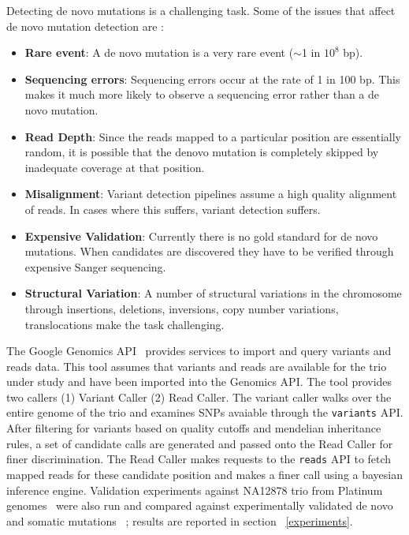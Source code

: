 \documentclass{article}
\begin{document}
\vspace{1em}
Detecting de novo mutations is a challenging task. Some of the issues that affect de novo mutation detection are : 
\begin{itemize}
\item \textbf{Rare event}: A de novo mutation is a very rare event ($\sim$1 in $10^8$ bp).
\item \textbf{Sequencing errors}: Sequencing errors occur at the rate of 1 in 100 bp. This makes it much more likely to observe a sequencing error rather than a de novo mutation.
\item \textbf{Read Depth}: Since the reads mapped to a particular position are essentially random, it is possible that the denovo mutation is completely skipped by inadequate coverage at that position.
\item \textbf{Misalignment}: Variant detection pipelines assume a high quality alignment of reads. In cases where this suffers, variant detection suffers.
\item \textbf{Expensive Validation}: Currently there is no gold standard for de novo mutations. When candidates are discovered they have to be verified through expensive Sanger sequencing.
\item \textbf{Structural Variation}: A number of structural variations in the chromosome through insertions, deletions, inversions, copy number variations, translocations make the task challenging.
\end{itemize}

The Google Genomics API~\cite{GoogleGenomics} provides services to import and query variants and reads data. This tool assumes that variants and reads are available for the trio under study and have been imported into the Genomics API. The tool provides two callers (1) Variant Caller (2) Read Caller. The variant caller walks over the entire genome of the trio and examines SNPs avaiable through the \verb|variants| API. After filtering for variants based on quality cutoffs and mendelian inheritance rules, a set of candidate calls are generated and passed onto the Read Caller for finer discrimination. The Read Caller makes requests to the \verb|reads| API to fetch mapped reads for these candidate position and makes a finer call using a bayesian inference engine.  Validation experiments against NA12878 trio from Platinum genomes~\cite{platinum} were also run and compared against experimentally validated de novo and somatic mutations~\cite{Conrad2011} ; results are reported in section ~\ref{experiments}.
\end{document}
